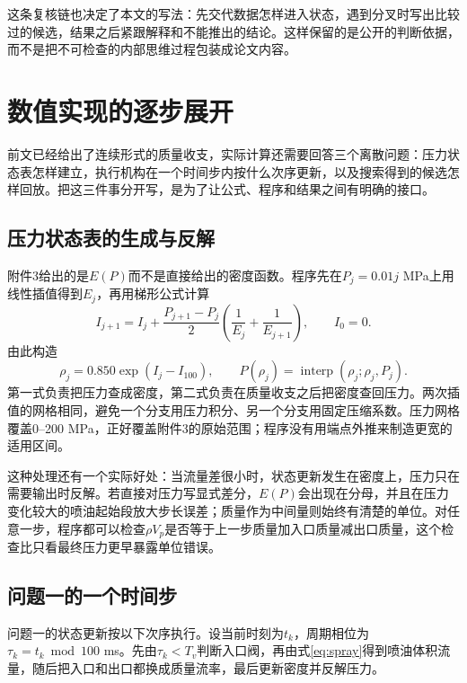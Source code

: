 \documentclass[UTF8,11pt,a4paper]{ctexart}
\begin{document}
这条复核链也决定了本文的写法：先交代数据怎样进入状态，遇到分叉时写出比较过的候选，结果之后紧跟解释和不能推出的结论。这样保留的是公开的判断依据，而不是把不可检查的内部思维过程包装成论文内容。

\section{数值实现的逐步展开}

前文已经给出了连续形式的质量收支，实际计算还需要回答三个离散问题：压力状态表怎样建立，执行机构在一个时间步内按什么次序更新，以及搜索得到的候选怎样回放。把这三件事分开写，是为了让公式、程序和结果之间有明确的接口。

\subsection{压力状态表的生成与反解}

附件3给出的是$E(P)$而不是直接给出的密度函数。程序先在$P_j=0.01j$ MPa上用线性插值得到$E_j$，再用梯形公式计算
\begin{equation}
 I_{j+1}=I_j+\frac{P_{j+1}-P_j}{2}\left(\frac{1}{E_j}+\frac{1}{E_{j+1}}\right),\qquad I_0=0.
\end{equation}
由此构造
\begin{equation}
 \rho_j=0.850\exp(I_j-I_{100}),
 \qquad P(\rho_j)=\operatorname{interp}(\rho_j;\rho_j,P_j).
\end{equation}
第一式负责把压力查成密度，第二式负责在质量收支之后把密度查回压力。两次插值的网格相同，避免一个分支用压力积分、另一个分支用固定压缩系数。压力网格覆盖0--200 MPa，正好覆盖附件3的原始范围；程序没有用端点外推来制造更宽的适用区间。

这种处理还有一个实际好处：当流量差很小时，状态更新发生在密度上，压力只在需要输出时反解。若直接对压力写显式差分，$E(P)$会出现在分母，并且在压力变化较大的喷油起始段放大步长误差；质量作为中间量则始终有清楚的单位。对任意一步，程序都可以检查$\rho V_p$是否等于上一步质量加入口质量减出口质量，这个检查比只看最终压力更早暴露单位错误。

\subsection{问题一的一个时间步}

问题一的状态更新按以下次序执行。设当前时刻为$t_k$，周期相位为$\tau_k=t_k\bmod100$ ms。先由$\tau_k<T_v$判断入口阀，再由式\eqref{eq:spray}得到喷油体积流量，随后把入口和出口都换成质量流率，最后更新密度并反解压力。
\end{document}
